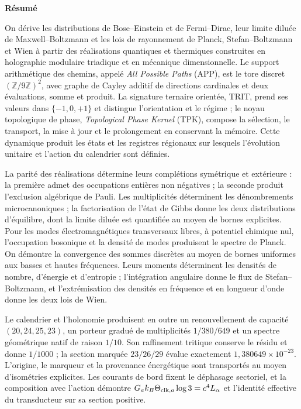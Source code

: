 {}
\begin{center}\bfseries Résumé\end{center}
\begingroup
\fontsize{9.5}{10.7}\selectfont
\setlength{\parskip}{1.5pt plus .5pt minus .5pt}
\noindent
On dérive les distributions de Bose--Einstein et de Fermi--Dirac, leur limite
diluée de Maxwell--Boltzmann et les lois de rayonnement de Planck,
Stefan--Boltzmann et Wien à partir des réalisations quantiques et thermiques
construites en holographie modulaire triadique et en mécanique dimensionnelle.
Le support arithmétique des chemins, appelé \emph{All Possible Paths}
(APP), est le tore discret \((\mathbb Z/9\mathbb Z)^2\), avec graphe de
Cayley additif de directions cardinales et deux évaluations, somme et
produit. La signature ternaire orientée, TRIT, prend ses valeurs dans
\(\{-1,0,+1\}\) et distingue l’orientation et le régime ; le noyau topologique
de phase, \emph{Topological Phase Kernel} (TPK), compose la sélection,
le transport, la mise à jour et le prolongement en conservant la mémoire.
Cette dynamique produit les états et les registres régionaux sur lesquels
l’évolution unitaire et l’action du calendrier sont définies.

La parité des réalisations détermine leurs complétions symétrique et
extérieure : la première admet des occupations entières non négatives ; la seconde
produit l’exclusion algébrique de Pauli. Les multiplicités déterminent les dénombrements microcanoniques ; la
factorisation de l’état de Gibbs donne les deux distributions d’équilibre,
dont la limite diluée est quantifiée au moyen de bornes explicites. Pour les
modes électromagnétiques transversaux libres, à potentiel chimique nul,
l’occupation bosonique et la densité de modes produisent le spectre de
Planck. On démontre la convergence des sommes discrètes au moyen de
bornes uniformes aux basses et hautes fréquences. Leurs moments déterminent
les densités de nombre, d’énergie et d’entropie ; l’intégration angulaire donne
le flux de Stefan--Boltzmann, et l’extrémisation des densités en
fréquence et en longueur d’onde donne les deux lois de Wien.

Le calendrier et l’holonomie produisent en outre un renouvellement de capacité
$(20,24,25,23)$, un porteur gradué de multiplicités
$1/380/649$ et un spectre géométrique natif de raison $1/10$. Son
raffinement tritique conserve le résidu et donne $1/1000$ ; la section marquée
$23/26/29$ évalue exactement
$1{,}380649\times10^{-23}$. L’origine, le marqueur et la provenance
énergétique sont transportés au moyen d’isométries explicites. Les courants de
bord fixent le déphasage sectoriel, et la composition avec l’action démontre
$G_a k_B\Theta_{{\rm clk},a}\log3=c^4L_\alpha$ et l’identité effective du
transducteur sur sa section positive.

